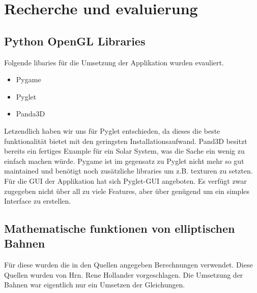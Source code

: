 \section{Recherche und evaluierung}
\label{sec:research}

\subsection{Python OpenGL Libraries}

Folgende libaries für die Umsetzung der Applikation wurden evauliert.

\begin{itemize}
	\item Pygame
	\item Pyglet
	\item Panda3D
\end{itemize}

Letzendlich haben wir uns für Pyglet entschieden, da dieses die beste funktionalität bietet mit den geringsten
Installationsaufwand. Pand3D besitzt bereits ein fertiges Example für ein Solar System, was die Sache ein wenig
zu einfach machen würde. Pygame ist im gegensatz zu Pyglet nicht mehr so gut maintained und benötigt noch
zusätzliche libraries um z.B. texturen zu setzten. 
\\
Für die GUI der Applikation hat sich Pyglet-GUI angeboten. Es verfügt zwar zugegeben nicht über all zu viele
Features, aber über genügend um ein simples Interface zu erstellen.

\subsection{Mathematische funktionen von elliptischen Bahnen}
Für diese wurden die in den Quellen angegeben Berechnungen verwendet. Diese Quellen wurden von Hrn. Rene Hollander
vorgeschlagen. Die Umsetzung der Bahnen war eigentlich nur ein Umsetzen der Gleichungen.